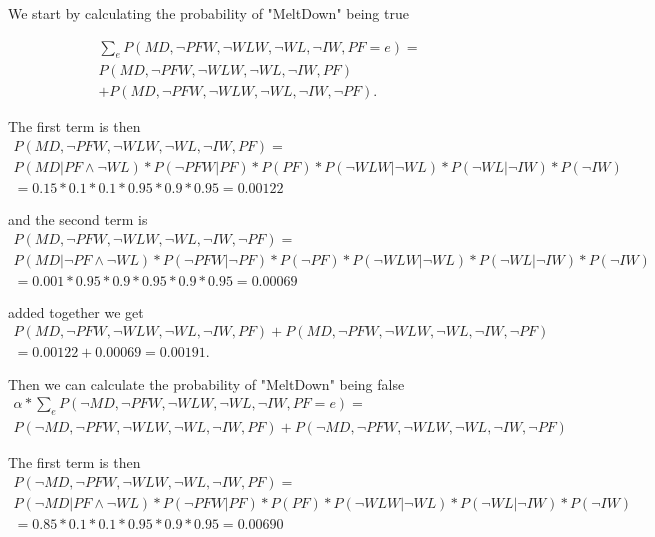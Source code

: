 \documentclass[a4paper,10pt]{article}
\begin{document}
We start by calculating the probability of "MeltDown" being true

\begin{multline*}
	\sum_e P(MD, \neg PFW, \neg WLW, \neg WL, \neg IW, PF = e) = \\
	P(MD, \neg PFW, \neg WLW, \neg WL, \neg IW, PF) \\
	+ P(MD, \neg PFW, \neg WLW, \neg WL, \neg IW, \neg PF).
\end{multline*}

The first term is then
\begin{multline*}
	P(MD, \neg PFW, \neg WLW, \neg WL, \neg IW, PF) = \\
	P(MD | PF \wedge \neg WL) * P(\neg PFW | PF) * P(PF) * P(\neg WLW | \neg WL) * P(\neg WL | \neg IW) * P(\neg IW) \\ 
	= 0.15 * 0.1 * 0.1 * 0.95 * 0.9 * 0.95 = 0.00122
\end{multline*}

and the second term is
\begin{multline*}
	P(MD, \neg PFW, \neg WLW, \neg WL, \neg IW, \neg PF) = \\
	P(MD | \neg PF \wedge \neg WL) * P(\neg PFW | \neg PF) * P(\neg PF) * P(\neg WLW | \neg WL) * P(\neg WL | \neg IW) * P(\neg IW) \\
	= 0.001 * 0.95 * 0.9 * 0.95 * 0.9 * 0.95 = 0.00069
\end{multline*}

added together we get
\begin{multline*}
	P(MD, \neg PFW, \neg WLW, \neg WL, \neg IW, PF) + P(MD, \neg PFW, \neg WLW, \neg WL, \neg IW, \neg PF) \\ 
	= 0.00122 + 0.00069 = 0.00191.
\end{multline*}

Then we can calculate the probability of "MeltDown" being false
\begin{multline*}
	\alpha * \sum_e P(\neg MD, \neg PFW, \neg WLW, \neg WL, \neg IW, PF = e) = \\
	P(\neg MD, \neg PFW, \neg WLW, \neg WL, \neg IW, PF) + P(\neg MD, \neg PFW, \neg WLW, \neg WL, \neg IW, \neg PF)
\end{multline*}

The first term is then
\begin{multline*}
	P(\neg MD, \neg PFW, \neg WLW, \neg WL, \neg IW, PF) = \\
	P(\neg MD | PF \wedge \neg WL) * P(\neg PFW | PF) * P(PF) * P(\neg WLW | \neg WL) * P(\neg WL | \neg IW) * P(\neg IW) \\
	= 0.85 * 0.1 * 0.1 * 0.95 * 0.9 * 0.95 = 0.00690
\end{multline*}
\end{document}
